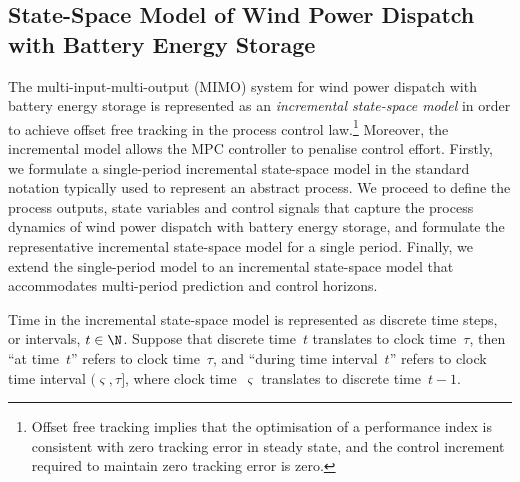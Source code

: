 \subsection{State-Space Model of Wind Power Dispatch with Battery Energy Storage}\label{sect:ssm_dispatch_bess}
The multi-input-multi-output (MIMO) system for wind power dispatch with battery energy storage is represented as an \textit{incremental state-space model} in order to achieve offset free tracking in the process control law.\footnote{
Offset free tracking implies that the optimisation of a performance index is consistent with zero tracking error in steady state, and the control increment required to maintain zero tracking error is zero.
}  Moreover, the incremental model allows the MPC controller to penalise control effort.  Firstly, we formulate a single-period incremental state-space model in the standard notation typically used to represent an abstract process.  We proceed to define the process outputs, state variables and control signals that capture the process dynamics of wind power dispatch with battery energy storage, and formulate the representative incremental state-space model for a single period.  Finally, we extend the single-period model to an incremental state-space model that accommodates multi-period prediction and control horizons.

Time in the incremental state-space model is represented as discrete time steps, or intervals, $t\in\N$.  Suppose that discrete time~$t$ translates to clock time~$\tau$, then ``at time~$t$'' refers to clock time~$\tau$, and ``during time interval~$t$'' refers to clock time interval $(\varsigma, \tau]$, where clock time~$\varsigma$ translates to discrete time~$t\!-\!1$.

